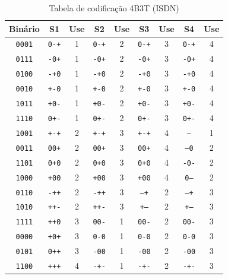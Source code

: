 \documentclass[conference]{IEEEtran}
\begin{document}
\begin{table}[ht]
\centering
\caption{Tabela de codificação 4B3T (ISDN)}
\renewcommand{\arraystretch}{1.2}
\setlength{\tabcolsep}{6pt}
\begin{tabular}{c|cc|cc|cc|cc}
\toprule
\textbf{Binário} & \textbf{S1} & \textbf{Use} & \textbf{S2} & \textbf{Use} & \textbf{S3} & \textbf{Use} & \textbf{S4} & \textbf{Use} \\
\midrule
\texttt{0001} & \texttt{0-+} & 1 & \texttt{0-+} & 2 & \texttt{0-+} & 3 & \texttt{0-+} & 4 \\
\texttt{0111} & \texttt{-0+} & 1 & \texttt{-0+} & 2 & \texttt{-0+} & 3 & \texttt{-0+} & 4 \\
\texttt{0100} & \texttt{-+0} & 1 & \texttt{-+0} & 2 & \texttt{-+0} & 3 & \texttt{-+0} & 4 \\
\texttt{0010} & \texttt{+-0} & 1 & \texttt{+-0} & 2 & \texttt{+-0} & 3 & \texttt{+-0} & 4 \\
\texttt{1011} & \texttt{+0-} & 1 & \texttt{+0-} & 2 & \texttt{+0-} & 3 & \texttt{+0-} & 4 \\
\texttt{1110} & \texttt{0+-} & 1 & \texttt{0+-} & 2 & \texttt{0+-} & 3 & \texttt{0+-} & 4 \\
\midrule
\texttt{1001} & \texttt{+-+} & 2 & \texttt{+-+} & 3 & \texttt{+-+} & 4 & \texttt{---} & 1 \\
\texttt{0011} & \texttt{00+} & 2 & \texttt{00+} & 3 & \texttt{00+} & 4 & \texttt{--0} & 2 \\
\texttt{1101} & \texttt{0+0} & 2 & \texttt{0+0} & 3 & \texttt{0+0} & 4 & \texttt{-0-} & 2 \\
\texttt{1000} & \texttt{+00} & 2 & \texttt{+00} & 3 & \texttt{+00} & 4 & \texttt{0--} & 2 \\
\texttt{0110} & \texttt{-++} & 2 & \texttt{-++} & 3 & \texttt{--+} & 2 & \texttt{--+} & 3 \\
\texttt{1010} & \texttt{++-} & 2 & \texttt{++-} & 3 & \texttt{+--} & 2 & \texttt{+--} & 3 \\
\texttt{1111} & \texttt{++0} & 3 & \texttt{00-} & 1 & \texttt{00-} & 2 & \texttt{00-} & 3 \\
\texttt{0000} & \texttt{+0+} & 3 & \texttt{0-0} & 1 & \texttt{0-0} & 2 & \texttt{0-0} & 3 \\
\texttt{0101} & \texttt{0++} & 3 & \texttt{-00} & 1 & \texttt{-00} & 2 & \texttt{-00} & 3 \\
\texttt{1100} & \texttt{+++} & 4 & \texttt{-+-} & 1 & \texttt{-+-} & 2 & \texttt{-+-} & 3 \\
\bottomrule
\end{tabular}
\label{tab:4b3t}
\end{table}
\end{document}
